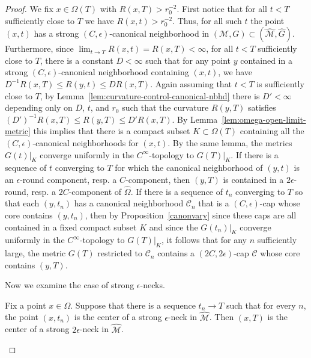 \begin{proof}
We fix $x\in \Omega(T)$ with $R(x,T)>r_0^{-2}$. First notice that
 for all $t<T$ sufficiently close to $T$ we
have $R(x,t)>r_0^{-2}$. Thus, for all such $t$ the point $(x,t)$ has
a strong $(C,\epsilon)$-canonical neighborhood in $({\mathcal M},G)\subset (\widehat{\mathcal
M},\widehat G)$. Furthermore, since $\lim_{t\rightarrow
T}R(x,t)=R(x,T)<\infty$, for all $t<T$ sufficiently close to $T$,
there is a constant $D<\infty$ such that for any point $y$ contained
in  a strong $(C,\epsilon)$-canonical neighborhood containing
$(x,t)$, we have $D^{-1}R(x,T)\le R(y,t)\le DR(x,T)$. Again assuming
that $t<T$ is sufficiently close to $T$, by Lemma~\ref{lem:curvature-control-canonical-nbhd}
there is $D'<\infty$ depending only on $D$, $t$, and $r_0$ such that
the curvature $R(y,T)$ satisfies $(D')^{-1}R(x,T)\le R(y,T)\le
D'R(x,T)$. By Lemma~\ref{lem:omega-open-limit-metric} this implies that there is a
compact subset $K\subset \Omega(T)$ containing all the
$(C,\epsilon)$-canonical neighborhoods for $(x,t)$.
 By the same lemma, the metrics $G(t)|_K$
converge uniformly in the $C^\infty$-topology to $G(T)|_K$. If there
is a sequence of $t$ converging to $T$ for which the canonical
neighborhood of $(y,t)$ is an $\epsilon$-round component, resp. a
$C$-component, then $(y,T)$ is contained in a $2\epsilon$-round,
resp. a $2C$-component of $\widehat \Omega$. If there is a sequence
of $t_n$ converging to $T$ so that each $(y,t_n)$ has a canonical
neighborhood ${\mathcal C}_n$ that is a $(C,\epsilon)$-cap whose
core contains $(y,t_n)$, then by Proposition~\ref{canonvary} since
these caps are all contained in a fixed compact subset $K$ and since
the $G(t_n)|_K$ converge uniformly in the $C^\infty$-topology to
$G(T)|_K$, it follows that for any $n$  sufficiently large, the
metric $G(T)$ restricted to ${\mathcal C}_n$ contains a
$(2C,2\epsilon)$-cap ${\mathcal C}$ whose core contains $(y,T)$.



Now we examine the case of strong $\epsilon$-necks.

\begin{claim}
\label{claim:limit-of-necks-is-neck}
\label{epslimit}
Fix a point $x\in\Omega$. Suppose that there is a sequence
$t_n\rightarrow T$ such that for every $n$, the point $(x,t_n)$ is
the center of a strong $\epsilon$-neck in $\widehat{\mathcal M}$.
Then $(x,T)$ is the center of a strong $2\epsilon$-neck in $\widehat
{\mathcal M}$.
\end{claim}


\end{proof}
